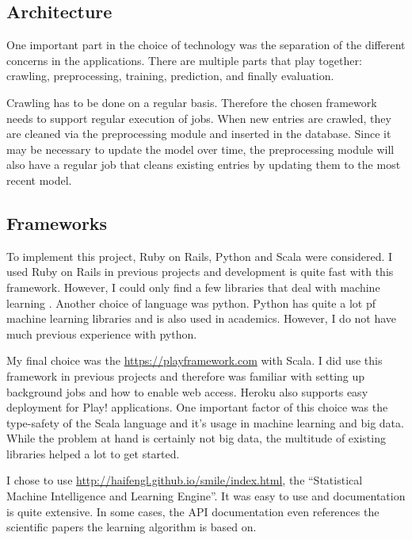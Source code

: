 \documentclass[journal,10pt]{IEEEtran}
\begin{document}
%
%

\subsection{Architecture}\label{sec:architecture}
One important part in the choice of technology was the separation of the different concerns in the applications. There are multiple parts that play together: crawling, preprocessing, training, prediction, and finally evaluation. 

Crawling has to be done on a regular basis. Therefore the chosen framework needs to support regular execution of jobs. When new entries are crawled, they are cleaned via the preprocessing module and inserted in the database. Since it may be necessary to update the model over time, the preprocessing module will also have a regular job that cleans existing entries by updating them to the most recent model.



\subsection{Frameworks}\label{sec:frameworks}
To implement this project, Ruby on Rails, Python and Scala were considered. I used Ruby on Rails in previous projects and development is quite fast with this framework. However, I could only find a few libraries that deal with machine learning \cite{bigml} \cite{leanpanda}. 
Another choice of language was python. Python has quite a lot pf machine learning libraries and is also used in academics. However, I do not have much previous experience with python.

My final choice was the \href{Play! framework}{https://playframework.com} with Scala. I did use this framework in previous projects and therefore was familiar with setting up background jobs and how to enable web access. Heroku also supports easy deployment for Play! applications. One important factor of this choice was the type-safety of the Scala language and it's usage in machine learning and big data. While the problem at hand is certainly not big data, the multitude of existing libraries helped a lot to get started.

I chose to use \href{Smile}{http://haifengl.github.io/smile/index.html}, the ``Statistical Machine Intelligence and Learning Engine''. It was easy to use and documentation is quite extensive. In some cases, the API documentation even references the scientific papers the learning algorithm is based on. 
\end{document}
